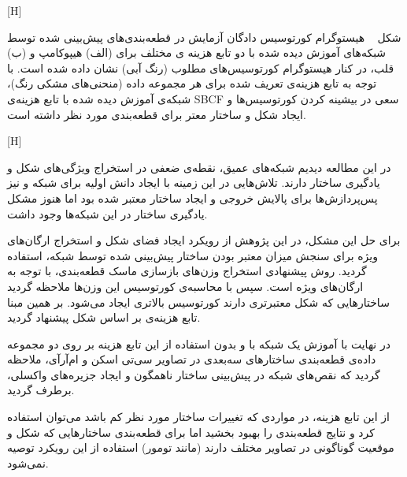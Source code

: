 [H]

شکل ~ هیستوگرام کورتوسیس دادگان آزمایش در قطعه‌بندی‌های پیش‌بینی شده توسط شبکه‌های آموزش دیده شده با دو تابع هزینه ی مختلف برای (الف) هیپوکامپ و (ب) قلب، در کنار هیستوگرام کورتوسیس‌های مطلوب (رنگ آبی) نشان داده شده است. با توجه به تابع هزینه‌ی تعریف شده برای هر مجموعه داده (منحنی‌های مشکی رنگ)، شبکه‌ی آموزش دیده شده با تابع هزینه‌ی SBCF سعی در بیشینه کردن کورتوسیس‌ها و ایجاد شکل و ساختار معتر برای قطعه‌بندی مورد نظر داشته است.


[H]

در این مطالعه دیدیم شبکه‌های عمیق، نقطه‌ی ضعفی در استخراج ویژگی‌های شکل و یادگیری ساختار دارند. تلاش‌هایی در این زمینه با ایجاد دانش اولیه برای شبکه و نیز پس‌پردازش‌ها برای پالایش خروجی و ایجاد ساختار معتبر شده بود اما هنوز مشکل یادگیری ساختار در این شبکه‌ها وجود داشت. 

برای حل این مشکل، در این پژوهش از رویکرد ایجاد فضای شکل و استخراج ارگان‌های ویژه برای سنجش میزان معتبر بودن ساختار پیش‌بینی شده توسط شبکه، استفاده گردید. روش‌ پیشنهادی استخراج وزن‌های بازسازی ماسک قطعه‌بندی، با توجه به ارگان‌های ویژه‌ است. سپس با محاسبه‌ی کورتوسیس این وزن‌ها ملاحظه گردید ساختارهایی که شکل معتبرتری دارند کورتوسیس بالاتری ایجاد می‌شود. بر همین مبنا تابع هزینه‌ی بر اساس شکل پیشنهاد گردید.

در نهایت با آموزش یک شبکه با و بدون استفاده از این تابع هزینه بر روی دو مجموعه داده‌ی قطعه‌بندی ساختارهای سه‌بعدی در تصاویر سی‌تی اسکن و ام‌آرآی، ملاحظه گردید که نقص‌های شبکه در پیش‌بینی ساختار ناهمگون و ایجاد جزیره‌های واکسلی، برطرف گردید.

از این تابع هزینه، در مواردی که تغییرات ساختار مورد نظر کم باشد می‌توان استفاده کرد و نتایج قطعه‌بندی را بهبود بخشید اما برای قطعه‌بندی ساختارهایی که شکل و موقعیت گوناگونی در تصاویر مختلف دارند (مانند تومور) استفاده از این رویکرد توصیه نمی‌شود.

